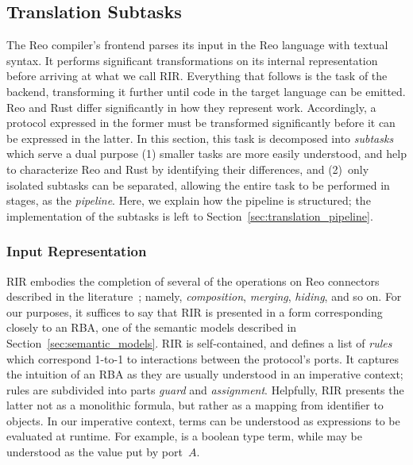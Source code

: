 \subsection{Translation Subtasks}
\label{sec:sub_tasks}
The Reo compiler's frontend parses its input in the Reo language with textual syntax. It performs significant transformations on its internal representation before arriving at what we call RIR. Everything that follows is the task of the backend, transforming it further until code in the target language can be emitted. Reo and Rust differ significantly in how they represent work. Accordingly, a protocol expressed in the former must be transformed significantly before it can be expressed in the latter. In this section, this task is decomposed into \textit{subtasks} which serve a dual purpose (1) smaller tasks are more easily understood, and help to characterize Reo and Rust by identifying their differences, and (2)~only isolated subtasks can be separated, allowing the entire task to be performed in stages, as the \textit{pipeline}.  Here, we explain how the pipeline is structured; the implementation of the subtasks is left to Section~\ref{sec:translation_pipeline}.

\subsubsection{Input Representation}
RIR embodies the completion of several of the operations on Reo connectors described in the literature~\cite{baier2006modeling, dokter2018rule}; namely, \textit{composition}, \textit{merging}, \textit{hiding}, and so on. For our purposes, it suffices to say that RIR is presented in a form corresponding closely to an RBA, one of the semantic models described in Section~\ref{sec:semantic_models}. RIR is self-contained, and defines a list of \textit{rules} which correspond 1-to-1 to interactions between the protocol's ports. It captures the intuition of an RBA as they are usually understood in an imperative context; rules are subdivided into parts \textit{guard} and \textit{assignment}. Helpfully, RIR presents the latter not as a monolithic formula, but rather as a mapping from identifier to  objects. In our imperative context, terms can be understood as expressions to be evaluated at runtime. For example,  is a boolean type term, while  may be understood as the value put by port~$A$.

